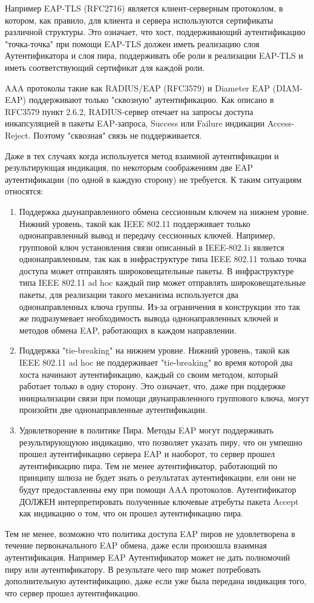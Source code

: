 Например EAP-TLS (RFC2716) является клиент-серверным протоколом, в котором, как правило, для клиента и сервера используются сертификаты различной структуры. Это означает, что хост, поддерживающий аутентификацию "точка-точка" при помощи EAP-TLS должен иметь реализацию слоя Аутентификатора и слоя пира, поддерживать обе роли в реализации EAP-TLS и иметь соответствующий сертификат для каждой роли.

AAA протоколы такие как RADIUS/EAP (RFC3579) и Diameter EAP (DIAM-EAP) поддерживают только "сквозную" аутентификацию. Как описано в RFC3579 пункт 2.6.2, RADIUS-сервер отечает на запросы доступа инкапсуляцией в пакеты EAP-запроса, Success или Failure индикации Access-Reject. Поэтому "сквозная" связь не поддерживается.

Даже в тех случаях когда используется метод взаимной аутентификации и результирующая индикация, по некоторым соображениям две EAP аутентификации (по одной в каждую сторону) не требуется. К таким ситуациям относятся:

\begin{enumerate}
\item Поддержка дыунаправленного обмена сессионным ключем на нижнем уровне. Нижний уровень, такой как IEEE 802.11 поддерживает только однонаправленный вывод и передачу сессионных ключей. Например, групповой ключ установления связи описанный в IEEE-802.1i является однонаправленным, так как в инфраструктуре типа IEEE 802.11 только точка доступа может отправлять широковещательные пакеты. В инфраструктуре типа IEEE 802.11 ad hoc каждый пир может отправлять широковещательные пакеты, для реализации такого механизма используется два однонаправленных ключа группы. Из-за ограничения в конструкции это так же подразумевает необходимость вывода однонаправленных ключей и методов обмена EAP, работающих в каждом направлении.
\item Поддержка "tie-breaking" на нижнем уровне. Нижний уровень, такой как IEEE 802.11 ad hoc не поддерживает "tie-breaking" во время которой два хоста начинают аутентификацию, каждый со своим методом, который работает только в одну сторону. Это означает, что, даже при поддержке инициализации связи при помощи двунаправленного группового ключа, могут произойти две однонаправленные аутентификации.
\item Удовлетворение в политике Пира. Методы EAP могут поддерживать результирующуюю индикацию, что позволяет указать пиру, что он умпешно прошел аутентификацию сервера EAP и наоборот, то сервер прошел аутентификацию пира. Тем не менее аутентификатор, работающий по принципу шлюза не будет знать о результатах аутентификации, ели они не будут предоставленны ему при помощи AAA протоколов. Аутентификатор ДОЛЖЕН интерпретировать полученные ключевые атребуты пакета Accept как индикацию о том, что он прошел аутентификацию пира.
\end{enumerate}

Тем не менее, возможно что политика доступа EAP пиров не удовлетворена в течение первоначального EAP обмена, даже если произошла взаимная аутентификация. Например EAP Аутентификатор может не дать полномочий пиру или аутентификатору. В результате чего пир может потребовать дополнительную аутентификацию, даже если уже была передана индикация того, что сервер прошел аутентификацию.
